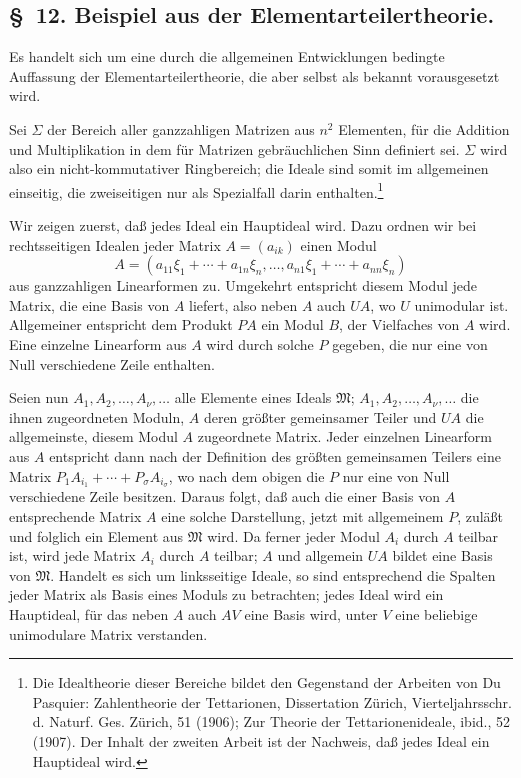 \documentclass[11pt]{article}
\newcommand{\ideal}[1]{\mathfrak{#1}}
\begin{document}
\subsection*{\S~12. Beispiel aus der Elementarteilertheorie.}

Es handelt sich um eine durch die allgemeinen Entwicklungen bedingte Auffassung der Elementarteilertheorie, die aber selbst als bekannt vorausgesetzt wird.

Sei $\Sigma$ der Bereich aller ganzzahligen Matrizen aus $n^2$ Elementen, für die Addition und Multiplikation in dem für Matrizen gebräuchlichen Sinn definiert sei. $\Sigma$ wird also ein nicht-kommutativer Ringbereich; die Ideale sind somit im allgemeinen einseitig, die zweiseitigen nur als Spezialfall darin enthalten.\footnote{Die Idealtheorie dieser Bereiche bildet den Gegenstand der Arbeiten von Du Pasquier: Zahlentheorie der Tettarionen, Dissertation Zürich, Vierteljahrsschr. d. Naturf. Ges. Zürich, 51 (1906); Zur Theorie der Tettarionenideale, ibid., 52 (1907). Der Inhalt der zweiten Arbeit ist der Nachweis, daß jedes Ideal ein Hauptideal wird.}

Wir zeigen zuerst, daß jedes Ideal ein Hauptideal wird. Dazu ordnen wir bei rechtsseitigen Idealen jeder Matrix $A=(a_{ik})$ einen Modul
\[
 A=(a_{11}\xi_1+\cdots+a_{1n}\xi_n,
 \ldots,
 a_{n1}\xi_1+\cdots+a_{nn}\xi_n)
\]
aus ganzzahligen Linearformen zu. Umgekehrt entspricht diesem Modul jede Matrix, die eine Basis von $A$ liefert, also neben $A$ auch $UA$, wo $U$ unimodular ist. Allgemeiner entspricht dem Produkt $PA$ ein Modul $B$, der Vielfaches von $A$ wird. Eine einzelne Linearform aus $A$ wird durch solche $P$ gegeben, die nur eine von Null verschiedene Zeile enthalten.

Seien nun $A_1,A_2,
\ldots,A_\nu,
\ldots$ alle Elemente eines Ideals $\ideal M$; $A_1,A_2,
\ldots,A_\nu,
\ldots$ die ihnen zugeordneten Moduln, $A$ deren größter gemeinsamer Teiler und $UA$ die allgemeinste, diesem Modul $A$ zugeordnete Matrix. Jeder einzelnen Linearform aus $A$ entspricht dann nach der Definition des größten gemeinsamen Teilers eine Matrix $P_1A_{i_1}+\cdots+P_\sigma A_{i_\sigma}$, wo nach dem obigen die $P$ nur eine von Null verschiedene Zeile besitzen. Daraus folgt, daß auch die einer Basis von $A$ entsprechende Matrix $A$ eine solche Darstellung, jetzt mit allgemeinem $P$, zuläßt und folglich ein Element aus $\ideal M$ wird. Da ferner jeder Modul $A_i$ durch $A$ teilbar ist, wird jede Matrix $A_i$ durch $A$ teilbar; $A$ und allgemein $UA$ bildet eine Basis von $\ideal M$. Handelt es sich um linksseitige Ideale, so sind entsprechend die Spalten jeder Matrix als Basis eines Moduls zu betrachten; jedes Ideal wird ein Hauptideal, für das neben $A$ auch $AV$ eine Basis wird, unter $V$ eine beliebige unimodulare Matrix verstanden.
\end{document}
